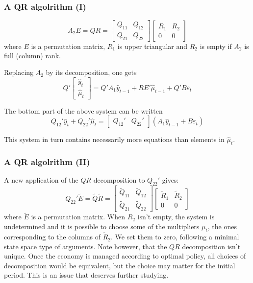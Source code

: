 \documentclass{beamer}
\begin{document}
\begin{frame}
  \frametitle{A QR algolrithm (I)}
\[
A_2E = QR = \left[
\begin{array}{cc}
  Q_{11} & Q_{12}\\ Q_{21} & Q_{22}
\end{array}\right]
\left[\begin{array}{cc}
  R_{1} & R_{2}\\ 0 & 0
\end{array}\right]
\]
where $E$ is a permutation matrix, $R_1$ is upper triangular and $R_2$ is empty if $A_2$ is full (column) rank.

Replacing $A_2$ by its decomposition, one gets
\[
Q'\left[
\begin{array}{c}
  \widehat y_t\\ \widehat\mu_t
\end{array}\right]
=
Q'A_1 \widehat y_{t-1}+R E'\widehat\mu_{t-1}+Q'B\varepsilon_t
\]

The bottom part of the above  system can be written
\[
    Q_{12}'\widehat y_t+Q_{22}'\widehat\mu_t = \left[
      \begin{array}{cc}Q_{12}' & Q_{22}'\end{array}\right]\left(A_1 \widehat y_{t-1}+B\varepsilon_t\right)
\]

This system in turn contains necessarily more equations than elements in $\widehat\mu_t$.
\end{frame}

\begin{frame}
  \frametitle{A QR algolrithm (II)}
A new application of the $QR$ decomposition to $Q_{22}'$ gives:
\[
Q_{22}'\widetilde E = \widetilde Q \widetilde R = \left[
\begin{array}{cc}
  \widetilde Q_{11} & \widetilde Q_{12}\\ \widetilde Q_{21} & \widetilde Q_{22}
\end{array}\right]
\left[\begin{array}{cc}
  \widetilde R_{1} & \widetilde R_2\\ 0 & 0
\end{array}\right]
\]
where $\widetilde E$ is a permutation matrix. When $R_2$ isn't empty, the system is undetermined and it is possible to choose some of the multipliers $\mu_t$, the ones corresponding to the columns of $\widetilde R_2$. We set them to zero, following a minimal state space type of arguments. Note however, that the $QR$ decomposition isn't unique. Once the economy is managed according to optimal policy, all choices of decomposition would be equivalent, but the choice may matter for the initial period. This is an issue that deserves further studying.
\end{frame}
\end{document}

